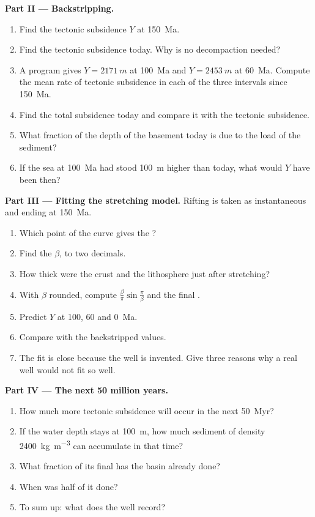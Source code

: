 \begin{problem}
\noindent\textbf{Part II --- Backstripping.}
\begin{enumerate}[resume]
  \item Find the tectonic subsidence $Y$ at \qty{150}{Ma}.
  \item Find the tectonic subsidence today. Why is no decompaction needed?
  \item A program gives $Y = \qty{2171}{m}$ at \qty{100}{Ma} and $Y = \qty{2453}{m}$ at
        \qty{60}{Ma}. Compute the mean rate of tectonic subsidence in each of the three
        intervals since \qty{150}{Ma}.
  \item Find the total subsidence today and compare it with the tectonic subsidence.
  \item What fraction of the depth of the basement today is due to the load of the sediment?
  \item If the sea at \qty{100}{Ma} had stood \qty{100}{m} higher than today, what would $Y$
        have been then?
\end{enumerate}

\noindent\textbf{Part III --- Fitting the stretching model.} Rifting is taken as instantaneous
and ending at \qty{150}{Ma}.
\begin{enumerate}[resume]
  \item Which point of the curve gives the ?
  \item Find the  $\beta$, to two decimals.
  \item How thick were the crust and the lithosphere just after stretching?
  \item With $\beta$ rounded, compute $\frac{\beta}{\pi}\sin\frac{\pi}{\beta}$ and the final
        .
  \item Predict $Y$ at 100, 60 and \qty{0}{Ma}.
  \item Compare with the backstripped values.
  \item The fit is close because the well is invented. Give three reasons why a real well would
        not fit so well.
\end{enumerate}

\noindent\textbf{Part IV --- The next 50 million years.}
\begin{enumerate}[resume]
  \item How much more tectonic subsidence will occur in the next \qty{50}{Myr}?
  \item If the water depth stays at \qty{100}{m}, how much sediment of density
        \qty{2400}{kg.m^{-3}} can accumulate in that time?
  \item What fraction of its final  has the basin already done?
  \item When was half of it done?
  \item To sum up: what  does the well record?
\end{enumerate}
\end{problem}

